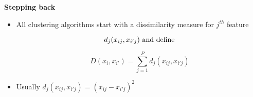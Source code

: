 \begin{slide}

{\bf Stepping back}

\begin{itemize}

\item All clustering algorithms start with a dissimilarity measure for $j^{th}$ feature

$$d_j (x_{ij} , x_{i' j}) \ \rm and\ define $$

$$D (x_i, x_{i'}) = \sum^P_{j=1} d_j (x_{ij}, x_{{i'}j} ) $$

\item[] Usually $d_j (x_{ij}, x_{i' j}) = (x_{ij} - x_{i'j})^2$

\end{itemize}

\newpage
\end{slide}
